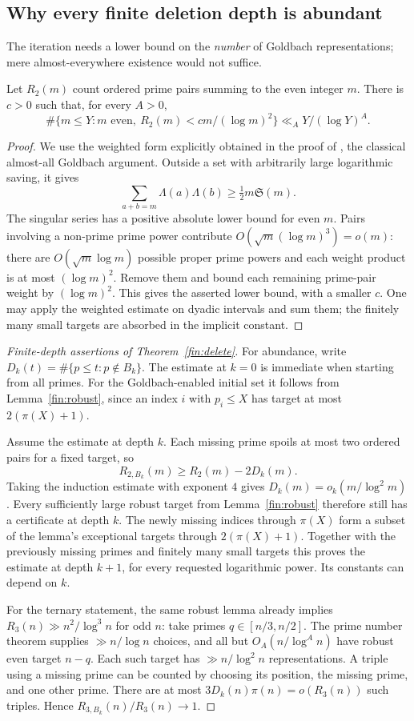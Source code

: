 \subsection{Why every finite deletion depth is abundant}\label{finapp:deletion}
The iteration needs a lower bound on the \emph{number} of Goldbach
representations; mere almost-everywhere existence would not suffice.
\begin{lemma}\label{fin:robust}
Let $R_2(m)$ count ordered prime pairs summing to the even integer $m$.
There is $c>0$ such that, for every $A>0$,
\[
 \#\{m\le Y:m\text{ even},\
       R_2(m)<cm/(\log m)^2\}\ll_A Y/(\log Y)^A.
\]
\end{lemma}
\begin{proof}
We use the weighted form explicitly obtained in the proof of
\cite[Theorem 4.3]{finBhowmikGrimmelt}, the classical almost-all
Goldbach argument.  Outside a set with arbitrarily large logarithmic
saving, it gives
\[
 \sum_{a+b=m}\Lambda(a)\Lambda(b)
             \ge \tfrac12m\mathfrak S(m).
\]
The singular series has a positive absolute lower bound for even $m$.
Pairs involving a non-prime prime power contribute
$O(\sqrt m(\log m)^3)=o(m)$: there are
$O(\sqrt m\log m)$ possible proper prime powers and each weight product
is at most $(\log m)^2$.  Remove them and bound each remaining
prime-pair weight by $(\log m)^2$.
This gives the asserted lower bound, with a smaller $c$.
One may apply the weighted estimate on dyadic intervals and sum them;
the finitely many small targets are absorbed in the implicit constant.
\end{proof}
\begin{proof}[Finite-depth assertions of Theorem~\ref{fin:delete}]
For abundance, write $D_k(t)=\#\{p\le t:p\notin B_k\}$.
The estimate at $k=0$ is immediate when starting from all primes.
For the Goldbach-enabled initial set it follows from
Lemma~\ref{fin:robust}, since an index $i$ with $p_i\le X$ has target
at most $2(\pi(X)+1)$.

Assume the estimate at depth $k$.  Each missing prime spoils at most
two ordered pairs for a fixed target, so
\[
 R_{2,B_k}(m)\ge R_2(m)-2D_k(m).
\]
Taking the induction estimate with exponent $4$ gives
$D_k(m)=o_k(m/\log^2m)$.
Every sufficiently large robust target from Lemma~\ref{fin:robust}
therefore still has a certificate at depth $k$.
The newly missing indices through $\pi(X)$ form a subset of the
lemma's exceptional targets through $2(\pi(X)+1)$.
Together with the previously missing primes and finitely many small
targets this proves the estimate at depth $k+1$, for every requested
logarithmic power.  Its constants can depend on $k$.

For the ternary statement, the same robust lemma already implies
$R_3(n)\gg n^2/\log^3n$ for odd $n$: take primes
$q\in[n/3,n/2]$.  The prime number theorem supplies
$\gg n/\log n$ choices, and all but $O_A(n/\log^A n)$ have robust
even target $n-q$.  Each such target has
$\gg n/\log^2n$ representations.
A triple using a missing prime can be counted by choosing its position,
the missing prime, and one other prime.  There are at most
$3D_k(n)\pi(n)=o(R_3(n))$ such triples.  Hence
\mbox{$R_{3,B_k}(n)/R_3(n)\to1$}.
\end{proof}

